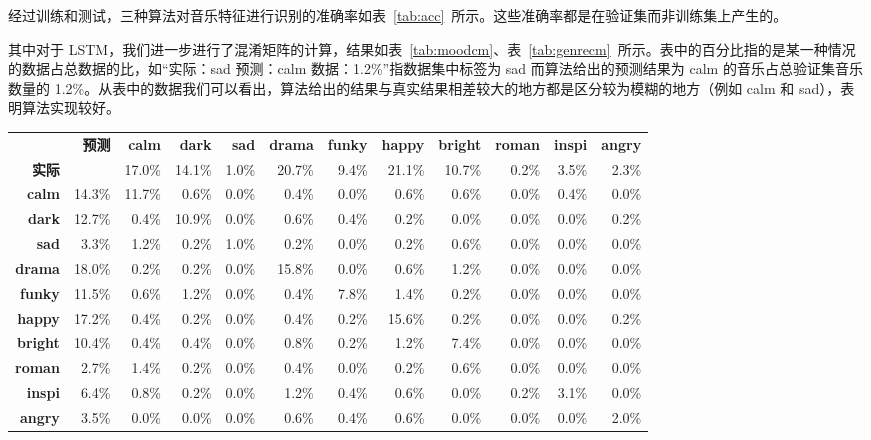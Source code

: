 \documentclass[a4paper,utf8,10pt]{article}
\begin{document}
经过训练和测试，三种算法对音乐特征进行识别的准确率如表~\ref{tab:acc}~所示。这些准确率都是在验证集而非训练集上产生的。

其中对于 LSTM，我们进一步进行了混淆矩阵的计算，结果如表~\ref{tab:moodcm}、表~\ref{tab:genrecm}~所示。表中的百分比指的是某一种情况的数据占总数据的比，如“实际：sad 预测：calm 数据：1.2\%”指数据集中标签为 sad 而算法给出的预测结果为 calm 的音乐占总验证集音乐数量的 1.2\%。从表中的数据我们可以看出，算法给出的结果与真实结果相差较大的地方都是区分较为模糊的地方（例如 calm 和 sad），表明算法实现较好。

\begin{center}

 \label{tab:moodcm}
\begin{tabular}{ | r r | r | r | r | r | r | r | r | r | r | r | }
\hline
 & \bf 预测 & \bf calm & \bf dark & \bf sad & \bf drama & \bf funky & \bf happy & \bf bright & \bf roman & \bf inspi & \bf angry \\
\bf 实际 & & 17.0\% & 14.1\% & 1.0\% & 20.7\% & 9.4\% & 21.1\% & 10.7\% & 0.2\% & 3.5\% & 2.3\% \\\hline
\bf calm & 14.3\% & 11.7\% & 0.6\% & 0.0\% & 0.4\% & 0.0\% & 0.6\% & 0.6\% & 0.0\% & 0.4\% & 0.0\% \\\hline
\bf dark & 12.7\% & 0.4\% & 10.9\% & 0.0\% & 0.6\% & 0.4\% & 0.2\% & 0.0\% & 0.0\% & 0.0\% & 0.2\% \\\hline
\bf sad & 3.3\% & 1.2\% & 0.2\% & 1.0\% & 0.2\% & 0.0\% & 0.2\% & 0.6\% & 0.0\% & 0.0\% & 0.0\% \\\hline
\bf drama & 18.0\% & 0.2\% & 0.2\% & 0.0\% & 15.8\% & 0.0\% & 0.6\% & 1.2\% & 0.0\% & 0.0\% & 0.0\% \\\hline
\bf funky & 11.5\% & 0.6\% & 1.2\% & 0.0\% & 0.4\% & 7.8\% & 1.4\% & 0.2\% & 0.0\% & 0.0\% & 0.0\% \\\hline
\bf happy & 17.2\% & 0.4\% & 0.2\% & 0.0\% & 0.4\% & 0.2\% & 15.6\% & 0.2\% & 0.0\% & 0.0\% & 0.2\% \\\hline
\bf bright & 10.4\% & 0.4\% & 0.4\% & 0.0\% & 0.8\% & 0.2\% & 1.2\% & 7.4\% & 0.0\% & 0.0\% & 0.0\% \\\hline
\bf roman & 2.7\% & 1.4\% & 0.2\% & 0.0\% & 0.4\% & 0.0\% & 0.2\% & 0.6\% & 0.0\% & 0.0\% & 0.0\% \\\hline
\bf inspi & 6.4\% & 0.8\% & 0.2\% & 0.0\% & 1.2\% & 0.4\% & 0.6\% & 0.0\% & 0.2\% & 3.1\% & 0.0\% \\\hline
\bf angry & 3.5\% & 0.0\% & 0.0\% & 0.0\% & 0.6\% & 0.4\% & 0.6\% & 0.0\% & 0.0\% & 0.0\% & 2.0\% \\\hline
\end{tabular}


\end{center}
\end{document}
